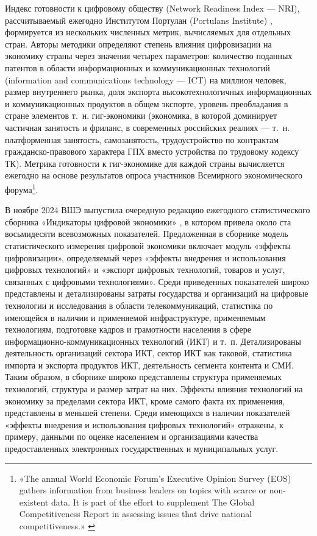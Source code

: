 \documentclass{article}
\begin{document}
Индекс готовности к цифровому обществу (Network Readiness Index — NRI), рассчитываемый ежегодно Институтом Портулан (Portulans Institute) \cite{networkReadinessIndex2024}, формируется из нескольких численных метрик, вычисляемых для отдельных стран. Авторы методики определяют степень влияния цифровизации на экономику страны через значения четырех параметров: количество поданных патентов в области информационных и коммуникационных технологий (information and communications technology — ICT) на миллион человек, размер внутреннего рынка, доля экспорта высокотехнологичных информационных и коммуникационных продуктов в общем экспорте, уровень преобладания в стране элементов т.~н. гиг-экономики (экономика, в которой доминирует частичная занятость и фриланс, в современных российских реалиях — т.~н. платформенная занятость, самозанятость, трудоустройство по контрактам гражданско-правового характера ГПХ вместо устройства по трудовому кодексу ТК). Метрика готовности к гиг-экономике для каждой страны вычисляется ежегодно на основе результатов опроса участников Всемирного экономического форума\footnote{«The annual World Economic Forum’s Executive Opinion Survey (EOS) gathers information from business leaders on topics with scarce or non-existent data. It is part of the effort to supplement The Global Competitiveness Report in assessing issues that drive national competitiveness.» \cite{networkReadinessIndex2024}}.

В ноябре 2024 ВШЭ выпустила очередную редакцию ежегодного статистического сборника «Индикаторы цифровой экономики» \cite{hseDigitalStats2024}, в котором привела около ста восьмидесяти всевозможных показателей. Предложенная в сборнике модель статистического измерения цифровой экономики включает модуль «эффекты цифровизации», определяемый через «эффекты внедрения и использования цифровых технологий» и «экспорт цифровых технологий, товаров и услуг, связанных с цифровыми технологиями». Среди приведенных показателей широко представлены и детализированы затраты государства и организаций на цифровые технологии и исследования в области телекоммуникаций, статистика по имеющейся в наличии и применяемой инфраструктуре, применяемым технологиям, подготовке кадров и грамотности населения в сфере информационно-коммуникационных технологий (ИКТ) и т.~п. Детализированы деятельность организаций сектора ИКТ, сектор ИКТ как таковой, статистика импорта и экспорта продуктов ИКТ, деятельность сегмента контента и СМИ. Таким образом, в сборнике широко представлены структура применяемых технологий, структура и размер затрат на них. Эффекты влияния технологий на экономику за пределами сектора ИКТ, кроме самого факта их применения, представлены в меньшей степени. Среди имеющихся в наличии показателей «эффекты внедрения и использования цифровых технологий» отражены, к примеру, данными по оценке населением и организациями качества предоставленных электронных государственных и муниципальных услуг.
\end{document}
